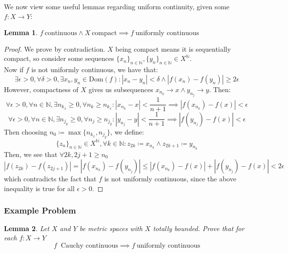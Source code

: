 \documentclass[10pt,letterpaper]{article} %
\newtheorem{lem}{Lemma}[section]
\begin{document}
We now view some useful lemmas regarding uniform continuity, given some $f: X \xrightarrow{} Y$:
\begin{lem}
$f  \ \text{continuous} \land X  \ \text{compact} \implies f \ \text{uniformly continuous}$
\end{lem}
\begin{proof}
We prove by contradiction. $X$ being compact means it is sequentially compact, so consider some sequences $\{x_n\}_{n \in \mathbb{N}}, \{y_n\}_{n \in \mathbb{N}} \in X^\mathbb{N}$.\\

Now if $f$ is not uniformly continuous, we have that:
\begin{equation*}
\exists \epsilon > 0, \forall \delta > 0, \exists x_n, y_n \in \text{Dom}(f): |x_n - y_n| < \delta \land |f(x_n) - f(y_n)| \geqslant 2\epsilon
\end{equation*}
However, compactness of $X$ gives us subsequences $x_{n_k} \xrightarrow{} x \land y_{n_j} \xrightarrow{} y$. Then:
\begin{equation*}
  \forall \epsilon > 0, \forall n \in \mathbb{N}, \exists n_{k_x} \geqslant 0, \forall n_k \geqslant n_{k_x}: |x_{n_k} - x| < \frac{1}{n + 1} \implies |f(x_{n_k}) - f(x)| < \epsilon
\end{equation*}
\begin{equation*}
  \forall \epsilon > 0, \forall n \in \mathbb{N}, \exists n_{j_y} \geqslant 0, \forall n_j \geqslant n_{j_y}: |y_{n_j} - y| < \frac{1}{n+1} \implies |f(y_{n_j}) - f(x)| < \epsilon
\end{equation*}
Then choosing $n_0 \coloneq \max\{n_{k_x}, n_{j_y}\}$, we define:
\begin{equation*}
\{z_n\}_{n \in \mathbb{N}} \in X^\mathbb{N}, \forall k \in \mathbb{N}: z_{2k} \coloneq x_{n_k} \land z_{2k+1} \coloneq y_{n_k}
\end{equation*}
Then, we see that $\forall 2k, 2j+1 \geqslant n_0$
\begin{equation*}
  |f(z_{2k}) - f(z_{2j+1})| = |f(x_{n_k}) - f(y_{n_j})| \leqslant |f(x_{n_k}) - f(x)| + |f(y_{n_j}) - f(x)| < 2\epsilon
\end{equation*}
which contradicts the fact that $f$ is not uniformly continuous, since the above inequality is true for all $\epsilon > 0$. 
\end{proof}


\subsubsection{Example Problem}
\begin{lem}
Let $X$ and $Y$ be metric spaces with $X$ totally bounded. Prove that for each $f: X \xrightarrow{} Y$
\begin{equation*}
f \ \text{ Cauchy continuous} \implies f \ \text{uniformly continuous}
\end{equation*}
\end{lem}
\end{document}
